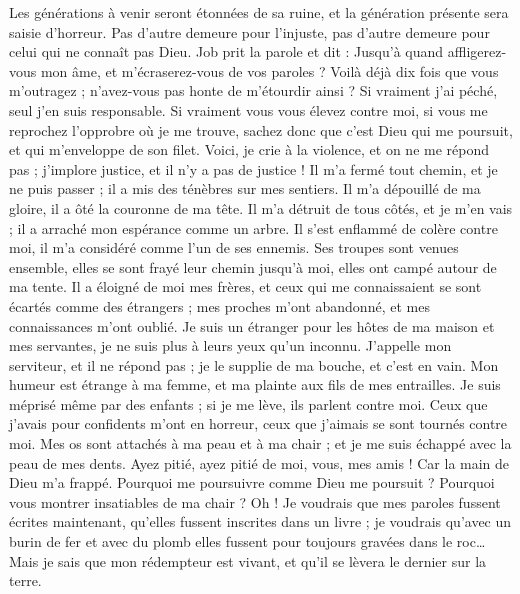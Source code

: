 \begin{multicols}{2}
Les générations à venir seront étonnées de sa ruine, et la génération présente sera saisie d'horreur.
Pas d'autre demeure pour l'injuste, pas d'autre demeure pour celui qui ne connaît pas Dieu.
\VerseOne{}Job prit la parole et dit :
Jusqu'à quand affligerez-vous mon âme, et m'écraserez-vous de vos paroles ?
Voilà déjà dix fois que vous m'outragez ; n'avez-vous pas honte de m'étourdir ainsi ?
Si vraiment j'ai péché, seul j'en suis responsable.
Si vraiment vous vous élevez contre moi, si vous me reprochez l'opprobre où je me trouve,
sachez donc que c'est Dieu qui me poursuit, et qui m'enveloppe de son filet.
Voici, je crie à la violence, et on ne me répond pas ; j'implore justice, et il n'y a pas de justice !
Il m'a fermé tout chemin, et je ne puis passer ; il a mis des ténèbres sur mes sentiers.
Il m'a dépouillé de ma gloire, il a ôté la couronne de ma tête.
Il m'a détruit de tous côtés, et je m'en vais ; il a arraché mon espérance comme un arbre.
Il s'est enflammé de colère contre moi, il m'a considéré comme l'un de ses ennemis.
Ses troupes sont venues ensemble, elles se sont frayé leur chemin jusqu'à moi, elles ont campé autour de ma tente.
Il a éloigné de moi mes frères, et ceux qui me connaissaient se sont écartés comme des étrangers ;
mes proches m'ont abandonné, et mes connaissances m'ont oublié.
Je suis un étranger pour les hôtes de ma maison et mes servantes, je ne suis plus à leurs yeux qu'un inconnu.
J'appelle mon serviteur, et il ne répond pas ; je le supplie de ma bouche, et c'est en vain.
Mon humeur est étrange à ma femme, et ma plainte aux fils de mes entrailles.
Je suis méprisé même par des enfants ; si je me lève, ils parlent contre moi.
Ceux que j'avais pour confidents m'ont en horreur, ceux que j'aimais se sont tournés contre moi.
Mes os sont attachés à ma peau et à ma chair ; et je me suis échappé avec la peau de mes dents.
Ayez pitié, ayez pitié de moi, vous, mes amis ! Car la main de Dieu m'a frappé.
Pourquoi me poursuivre comme Dieu me poursuit ? Pourquoi vous montrer insatiables de ma chair ?
Oh ! Je voudrais que mes paroles fussent écrites maintenant, qu'elles fussent inscrites dans un livre ;
je voudrais qu'avec un burin de fer et avec du plomb elles fussent pour toujours gravées dans le roc…
Mais je sais que mon rédempteur est vivant, et qu'il se lèvera le dernier sur la terre.

\end{multicols}
